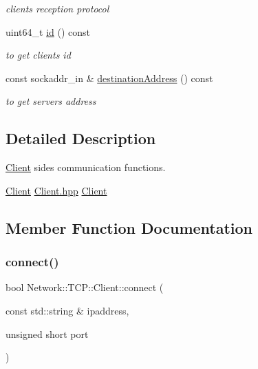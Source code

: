 \begin{DoxyCompactItemize}
\begin{DoxyCompactList}\small\item\em client\textquotesingle{}s reception protocol \end{DoxyCompactList}\item 
uint64\+\_\+t \hyperlink{class_network_1_1_t_c_p_1_1_client_a16807160db05b04f8a12d744c5954023}{id} () const
\begin{DoxyCompactList}\small\item\em to get client\textquotesingle{}s id \end{DoxyCompactList}\item 
const sockaddr\+\_\+in \& \hyperlink{class_network_1_1_t_c_p_1_1_client_a45c5f7987a2238d1eb00079c75e8351a}{destination\+Address} () const
\begin{DoxyCompactList}\small\item\em to get server\textquotesingle{}s address \end{DoxyCompactList}\end{DoxyCompactItemize}


\subsection{Detailed Description}
\hyperlink{class_network_1_1_t_c_p_1_1_client}{Client} side\textquotesingle{}s communication functions. 

\hyperlink{class_network_1_1_t_c_p_1_1_client}{Client} \hyperlink{_client_8hpp}{Client.\+hpp} \hyperlink{class_network_1_1_t_c_p_1_1_client}{Client} 

\subsection{Member Function Documentation}
\mbox{\label{class_network_1_1_t_c_p_1_1_client_a43d4da1617070a9ce3e7833c2ee7b4a0}} 
\subsubsection{\texorpdfstring{connect()}{connect()}}
{\footnotesize\ttfamily bool Network\+::\+T\+C\+P\+::\+Client\+::connect (\begin{DoxyParamCaption}\item[{const std\+::string \&}]{ipaddress,  }\item[{unsigned short}]{port }\end{DoxyParamCaption})}



